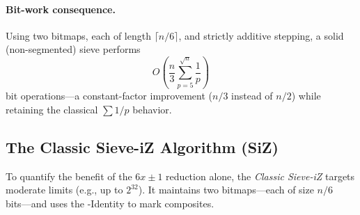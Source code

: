 \documentclass{article}
\begin{document}
\paragraph{Bit-work consequence.} Using two bitmaps, each of length $\lceil n/6\rceil$, and strictly additive stepping, a solid (non-segmented) sieve performs
\[
O\!\left(\frac{n}{3}\sum_{p=5}^{\sqrt n}\frac{1}{p}\right)
\]
bit operations—a constant-factor improvement ($n/3$ instead of $n/2$) while retaining the classical $\sum 1/p$ behavior.

\subsection{The Classic Sieve-iZ Algorithm (SiZ)} \label{sec:siz}

To quantify the benefit of the $6x\pm1$ reduction alone, the \emph{Classic Sieve-iZ} targets moderate limits (e.g., up to $2^{32}$). It maintains two bitmaps––each of size $n/6$ bits––and uses the \Xp-Identity to mark composites.
\end{document}

